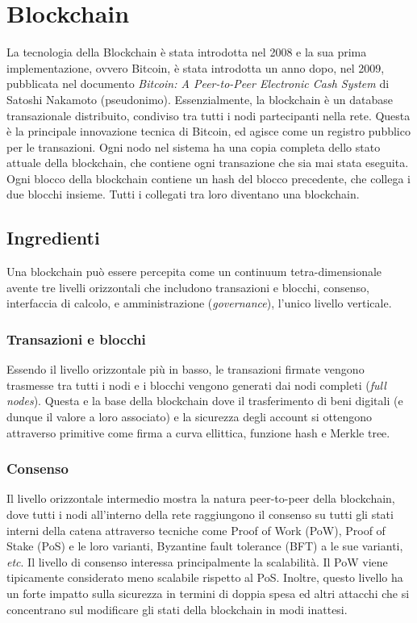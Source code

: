 \documentclass[a4paper,12pt]{article}
\begin{document}
\section{Blockchain}
La tecnologia della Blockchain è stata introdotta nel 2008 e la sua prima implementazione, ovvero Bitcoin, è stata introdotta un anno dopo, nel 2009, pubblicata nel documento \emph{Bitcoin: A Peer-to-Peer Electronic Cash System} \cite{c21} di Satoshi Nakamoto (pseudonimo). Essenzialmente, la blockchain è un database transazionale distribuito, condiviso tra tutti i nodi partecipanti nella rete. Questa è la principale innovazione tecnica di Bitcoin, ed agisce come un registro pubblico per le transazioni. Ogni nodo nel sistema ha una copia completa dello stato attuale della blockchain, che contiene ogni transazione che sia mai stata eseguita. Ogni blocco della blockchain contiene un hash del blocco precedente, che collega i due blocchi insieme. Tutti i collegati tra loro diventano una blockchain.

\subsection{Ingredienti}
Una blockchain può essere percepita come un continuum tetra-dimensionale avente tre livelli orizzontali che includono transazioni e blocchi, consenso, interfaccia di calcolo, e amministrazione (\emph{governance}), l'unico livello verticale.

\subsubsection{Transazioni e blocchi}
Essendo il livello orizzontale più in basso, le transazioni firmate vengono trasmesse tra tutti i nodi e i blocchi vengono generati dai nodi completi (\emph{full nodes}). Questa e la base della blockchain dove il trasferimento di beni digitali (e dunque il valore a loro associato) e la sicurezza degli account si ottengono attraverso primitive come firma a curva ellittica, funzione hash e Merkle tree.

\subsubsection{Consenso}
Il livello orizzontale intermedio mostra la natura peer-to-peer della blockchain, dove tutti i nodi all'interno della rete raggiungono il consenso su tutti gli stati interni della catena  attraverso tecniche come Proof of Work (PoW), Proof of Stake (PoS) e le loro varianti, Byzantine fault tolerance (BFT) a le sue varianti, \emph{etc}. Il livello di consenso interessa principalmente la scalabilità. Il PoW viene tipicamente considerato meno scalabile rispetto al PoS. Inoltre, questo livello ha un forte impatto sulla sicurezza in termini di doppia spesa ed altri attacchi che si concentrano sul modificare gli stati della blockchain in modi inattesi.
\end{document}
